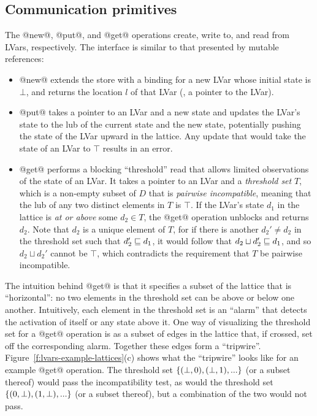 \subsection{Communication primitives}\label{subsection:lvars-communication-primitives}

The @new@, @put@, and @get@ operations create, write to, and read
from LVars, respectively. The interface is similar to that presented
by mutable references:

\begin{itemize}
\item @new@ extends the store with a binding for a new LVar whose
  initial state is $\bot$, and returns the location $l$ of that LVar
  (\ie, a pointer to the LVar).
\item @put@ takes a pointer to an LVar and a new state and updates the
  LVar's state to the lub of the current state and the new state,
  potentially pushing the state of the LVar upward in the lattice.
  Any update that would take the state of an LVar to $\top$ results in
  an error.
\item @get@ performs a blocking ``threshold'' read that allows limited
  observations of the state of an LVar.  It takes a pointer to an LVar
  and a \emph{threshold set} $T$, which is a non-empty subset of $D$
  that is \emph{pairwise incompatible}, meaning that the lub of any
  two distinct elements in $T$ is $\top$.  If the LVar's state $d_1$
  in the lattice is \emph{at or above} some $d_2 \in T$, the @get@
  operation unblocks and returns $d_2$.  Note that $d_2$ is a unique
  element of $T$, for if there is another $d_2' \neq d_2$ in the
  threshold set such that $d_2' \sqsubseteq d_1$, it would follow that
  $d_2 \sqcup d_2' \sqsubseteq d_1$, and so $d_2 \sqcup d_2'$ cannot be
  $\top$, which contradicts the requirement that $T$ be pairwise
  incompatible.
\end{itemize}

The intuition behind @get@ is that it specifies a subset of the
lattice that is ``horizontal'': no two elements in the threshold set
can be above or below one another.  Intuitively, each element in the
threshold set is an ``alarm'' that detects the activation of itself or
any state above it.  One way of visualizing the threshold set for a
@get@ operation is as a subset of edges in the lattice that, if
crossed, set off the corresponding alarm.  Together these edges form a
``tripwire''.  Figure~\ref{f:lvars-example-lattices}(c) shows what the
``tripwire'' looks like for an example @get@ operation.  The
threshold set $\lbrace (\bot, 0), (\bot, 1), ... \rbrace$ (or a subset
thereof) would pass the incompatibility test, as would the threshold
set $\lbrace (0, \bot), (1, \bot), ... \rbrace$ (or a subset thereof), but
a combination of the two would not pass.

